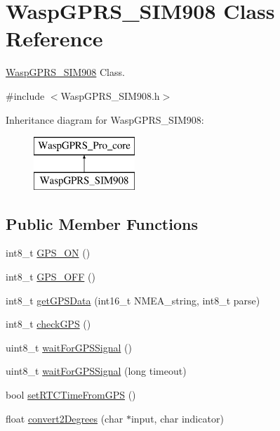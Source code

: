\hypertarget{class_wasp_g_p_r_s___s_i_m908}{}\section{Wasp\+G\+P\+R\+S\+\_\+\+S\+I\+M908 Class Reference}
\label{class_wasp_g_p_r_s___s_i_m908}


\hyperlink{class_wasp_g_p_r_s___s_i_m908}{Wasp\+G\+P\+R\+S\+\_\+\+S\+I\+M908} Class.  




{\ttfamily \#include $<$Wasp\+G\+P\+R\+S\+\_\+\+S\+I\+M908.\+h$>$}

Inheritance diagram for Wasp\+G\+P\+R\+S\+\_\+\+S\+I\+M908\+:\begin{figure}[H]
\begin{center}
\leavevmode
\includegraphics[height=2.000000cm]{class_wasp_g_p_r_s___s_i_m908}
\end{center}
\end{figure}
\subsection*{Public Member Functions}
\begin{DoxyCompactItemize}
\item 
int8\+\_\+t \hyperlink{class_wasp_g_p_r_s___s_i_m908_ac79ec2255e346bb7d04e2d62806f795f}{G\+P\+S\+\_\+\+ON} ()
\item 
int8\+\_\+t \hyperlink{class_wasp_g_p_r_s___s_i_m908_a7797a4369e9fc7e593c52cbb458dea23}{G\+P\+S\+\_\+\+O\+FF} ()
\item 
int8\+\_\+t \hyperlink{class_wasp_g_p_r_s___s_i_m908_ab7ca7363dd1be65d92a744c22a96c8a2}{get\+G\+P\+S\+Data} (int16\+\_\+t N\+M\+E\+A\+\_\+string, int8\+\_\+t parse)
\item 
int8\+\_\+t \hyperlink{class_wasp_g_p_r_s___s_i_m908_ac03894328a10506f2566f127c3c8f187}{check\+G\+PS} ()
\item 
uint8\+\_\+t \hyperlink{class_wasp_g_p_r_s___s_i_m908_a26ea517ba3496e0a10050548a37f7426}{wait\+For\+G\+P\+S\+Signal} ()
\item 
uint8\+\_\+t \hyperlink{class_wasp_g_p_r_s___s_i_m908_a33395f1afea11f761adf15e7b1784552}{wait\+For\+G\+P\+S\+Signal} (long timeout)
\item 
bool \hyperlink{class_wasp_g_p_r_s___s_i_m908_af9f54e6fcb008c3a460e03e3ad89577b}{set\+R\+T\+C\+Time\+From\+G\+PS} ()
\item 
float \hyperlink{class_wasp_g_p_r_s___s_i_m908_aa1508f4f8a89fbe6c314007eb1d956c2}{convert2\+Degrees} (char $\ast$input, char indicator)
\end{DoxyCompactItemize}
